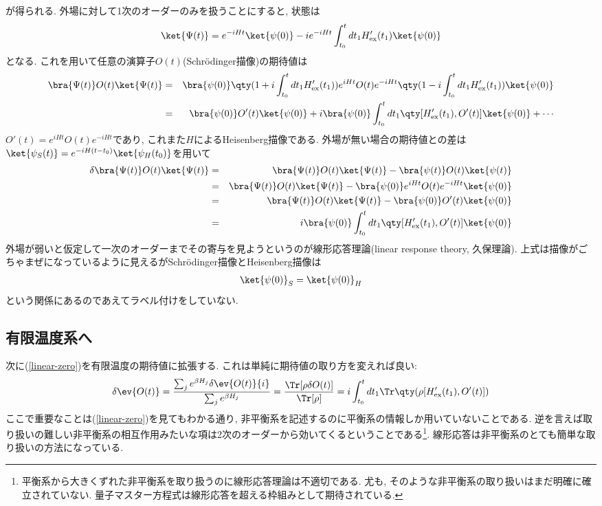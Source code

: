 \documentclass[10.5pt,a4paper]{jreport}
\begin{document}
が得られる. 外場に対して1次のオーダーのみを扱うことにすると, 状態は
\begin{eqnarray}
  \ket{\Psi(t)} = e^{-iHt}\ket{\psi(0)} -ie^{-iHt}\int_{t_0}^{t}dt_1H'_{\rm ex}(t_1)\ket{\psi(0)}
\end{eqnarray}
となる. これを用いて任意の演算子$O(t)$(Schr\"odinger描像)の期待値は
\begin{eqnarray}
  \bra{\Psi(t)}O(t)\ket{\Psi(t)} &=& \bra{\psi(0)}\qty(1 + i\int_{t_0}^{t}dt_1H'_{\rm ex}(t_1))e^{iHt}O(t)e^{-iHt}\qty(1 - i\int_{t_0}^{t}dt_1H'_{\rm ex}(t_1))\ket{\psi(0)}\\
  &=& \bra{\psi(0)}O'(t)\ket{\psi(0)} + i\bra{\psi(0)}\int_{t_0}^{t}dt_1\qty[H'_{\rm ex}(t_1), O'(t)]\ket{\psi(0)} + \cdots
\end{eqnarray}
$O'(t) = e^{iHt}O(t)e^{-iHt}$であり, これまた$H$によるHeisenberg描像である. 外場が無い場合の期待値との差は$\ket{\psi_S(t)} = e^{-iH(t-t_0)}\ket{\psi_H(t_0)}$を用いて
\begin{eqnarray}
  \nonumber  \delta\bra{\Psi(t)}O(t)\ket{\Psi(t)} &=& \bra{\Psi(t)}O(t)\ket{\Psi(t)} - \bra{\psi(t)}O(t)\ket{\psi(t)}\\
  \nonumber  &=& \bra{\Psi(t)}O(t)\ket{\Psi(t)} - \bra{\psi(0)}e^{iHt}O(t)e^{-iHt}\ket{\psi(0)}\\
  \nonumber  &=& \bra{\Psi(t)}O(t)\ket{\Psi(t)} - \bra{\psi(0)}O'(t)\ket{\psi(0)}\\
  &=& i\bra{\psi(0)}\int_{t_0}^{t}dt_1\qty[H'_{\rm ex}(t_1), O'(t)]\ket{\psi(0)}\label{linear-zero}
\end{eqnarray}
外場が弱いと仮定して一次のオーダーまでその寄与を見ようというのが線形応答理論(linear response theory, 久保理論). 上式は描像がごちゃまぜになっているように見えるがSchr\"odinger描像とHeisenberg描像は
\begin{eqnarray}
  \ket{\psi(0)}_S = \ket{\psi(0)}_H
\end{eqnarray}
という関係にあるのであえてラベル付けをしていない.
\subsection{有限温度系へ}
次に(\ref{linear-zero})を有限温度の期待値に拡張する. これは単純に期待値の取り方を変えれば良い:
\begin{eqnarray}
  \delta\ev{O(t)} = \frac{\sum_j e^{\beta H_j}\delta\ev{O(t)}{i}}{\sum_j e^{\beta H_j}} = \frac{\Tr[\rho \delta O(t)]}{\Tr[\rho]} = i\int_{t_0}^{t}dt_1 \Tr\qty(\rho [H'_{\rm ex}(t_1), O'(t)])
\end{eqnarray}
ここで重要なことは(\ref{linear-zero})を見てもわかる通り, 非平衡系を記述するのに平衡系の情報しか用いていないことである. 逆を言えば取り扱いの難しい非平衡系の相互作用みたいな項は2次のオーダーから効いてくるということである\footnote{平衡系から大きくずれた非平衡系を取り扱うのに線形応答理論は不適切である. 尤も, そのような非平衡系の取り扱いはまだ明確に確立されていない. 量子マスター方程式は線形応答を超える枠組みとして期待されている.}. 線形応答は非平衡系のとても簡単な取り扱いの方法になっている.
\end{document}
